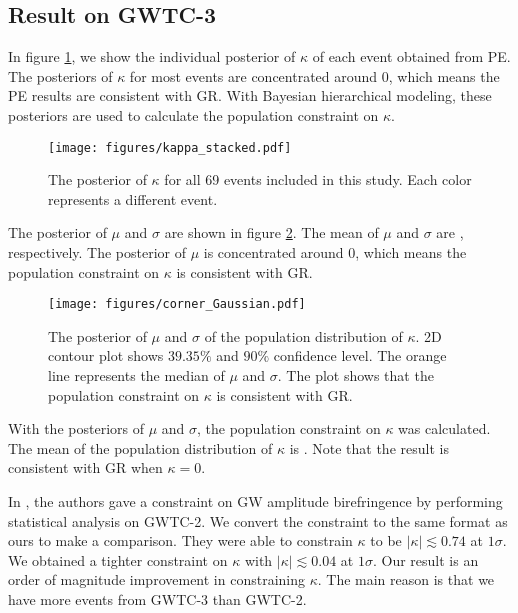 \documentclass[aps,prd,twocolumn,superscriptaddress,preprintnumbers,floatfix,nofootinbib]{revtex4-2}
\begin{document}
\subsection{Result on GWTC-3}
In figure \ref{fig:kappa_stacked}, we show the individual posterior of $\kappa$ of each event obtained from PE.
The posteriors of $\kappa$ for most events are concentrated around $0$, which means the PE results are consistent with GR.
With Bayesian hierarchical modeling, these posteriors are used to calculate the population constraint on $\kappa$.

\begin{figure}[h]
    \texttt{[image: figures/kappa\_stacked.pdf]}
    \caption{
        The posterior of $\kappa$ for all 69 events included in this study.
        Each color represents a different event.
    }
    \label{fig:kappa_stacked}
\end{figure}

The posterior of $\mu$ and $\sigma$ are shown in figure \ref{fig:corner_Gaussian}.
The mean of $\mu$ and $\sigma$ are , respectively.
The posterior of $\mu$ is concentrated around $0$, which means the population constraint on $\kappa$ is consistent with GR.

\begin{figure}[h]
    \texttt{[image: figures/corner\_Gaussian.pdf]}
    \caption{
        The posterior of $\mu$ and $\sigma$ of the population distribution of $\kappa$.
        2D contour plot shows $39.35\%$ and $90\%$ confidence level.
        The orange line represents the median of $\mu$ and $\sigma$.
        The plot shows that the population constraint on $\kappa$ is consistent with GR.
    }
    \label{fig:corner_Gaussian}
\end{figure}

With the posteriors of $\mu$ and $\sigma$, the population constraint on $\kappa$ was calculated.
The mean of the population distribution of $\kappa$ is .
Note that the result is consistent with GR when $\kappa=0$.

In \citet{Okounkova_2022}, the authors gave a constraint on GW amplitude birefringence by performing statistical analysis on GWTC-2.
We convert the constraint to the same format as ours to make a comparison.
They were able to constrain $\kappa$ to be $|\kappa| \lesssim 0.74$ at $1 \sigma$.
We obtained a tighter constraint on $\kappa$ with $|\kappa| \lesssim 0.04$ at $1 \sigma$.
Our result is an order of magnitude improvement in constraining $\kappa$.
The main reason is that we have more events from GWTC-3 than GWTC-2.
\end{document}
